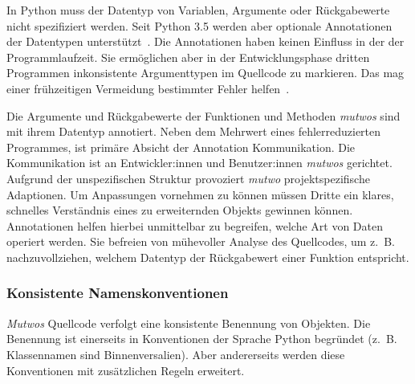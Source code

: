 \documentclass[12pt,a4paper,ngerman]{article}
\begin{document}
In Python muss der Datentyp von Variablen, Argumente oder Rückgabewerte nicht spezifiziert werden.
Seit Python 3.5 werden aber optionale Annotationen der Datentypen unterstützt~\parencite{typingModuleDocumentation}.
Die Annotationen haben keinen Einfluss in der der Programmlaufzeit.
Sie ermöglichen aber in der Entwicklungsphase dritten Programmen inkonsistente Argumenttypen im Quellcode zu markieren.
%
Das mag einer frühzeitigen Vermeidung bestimmter Fehler helfen~\parencite{typeHintPep}.

\bigskip

Die Argumente und Rückgabewerte der Funktionen und Methoden \emph{mutwos} sind mit ihrem Datentyp annotiert.
Neben dem Mehrwert eines fehlerreduzierten Programmes, ist primäre Absicht der Annotation Kommunikation.
Die Kommunikation ist an Entwickler:innen und Benutzer:innen \emph{mutwos} gerichtet.
Aufgrund der unspezifischen Struktur provoziert \emph{mutwo} projektspezifische Adaptionen.
Um Anpassungen vornehmen zu können müssen Dritte ein klares, schnelles Verständnis eines zu erweiternden Objekts gewinnen können.
Annotationen helfen hierbei unmittelbar zu begreifen, welche Art von Daten operiert werden.
Sie befreien von mühevoller Analyse des Quellcodes, um z.~B. nachzuvollziehen, welchem Datentyp der Rückgabewert einer Funktion entspricht.

\subsubsection{Konsistente Namenskonventionen}

\emph{Mutwos} Quellcode verfolgt eine konsistente Benennung von Objekten.
Die Benennung ist einerseits in Konventionen der Sprache Python begründet (z.~B. Klassennamen sind Binnenversalien).
Aber andererseits werden diese Konventionen mit zusätzlichen Regeln erweitert.
\end{document}
